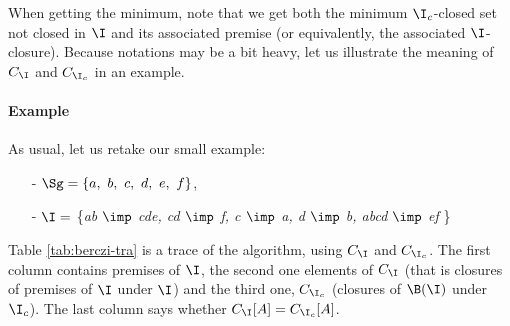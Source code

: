 When getting the minimum, note that we get both the minimum $\I_c$-closed set not closed in $\I$ and its associated premise (or equivalently, the associated $\I$-closure). Because notations may be a bit heavy, let us illustrate the meaning of $C_{\I}$ and $C_{\I_c}$ in an example.


\paragraph{Example} As usual, let us retake our small example:
\begin{itemize}
	\item[-] $\Sg = \{a, \ b, \ c, \ d, \ e, \ f \}$,
	\item[-] $\I =$ \{\textit{ab $\imp$ cde, cd $\imp$ f, c $\imp$ a, d $\imp$ b, abcd $\imp$ ef} \} 
\end{itemize}
\noindent Table \ref{tab:berczi-tra} is a trace of the algorithm, using $C_{\I}$ and $C_{\I_c}$. The first column contains premises of $\I$, the second one elements of $C_{\I}$ (that is closures of premises of $\I$ under $\I$) and
the third one, $C_{\I_c}$ (closures of $\B(\I)$ under $\I_c$). The last column
says whether $C_{\I}[A] = C_{\I_c}[A]$.

